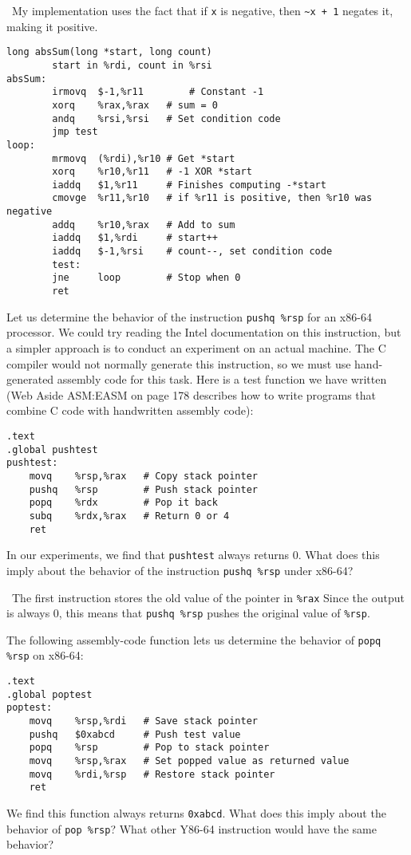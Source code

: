 \documentclass[12pt]{article}
\newenvironment{ex}[2][Exercise]{\begin{trivlist}
		\item[\hskip \labelsep {\bfseries #1}\hskip \labelsep {\bfseries #2.}]}{\end{trivlist}}
\newenvironment{sol}[1][Solution]{\begin{trivlist}
		\item[\hskip \labelsep {\bfseries #1:}]}{\end{trivlist}}
\begin{document}
\begin{sol}
	\
	My implementation uses the fact that if \texttt{x} is negative, then
	\texttt{\~{}x + 1} negates it, making it positive.
\begin{lstlisting}[language={}]
		long absSum(long *start, long count)
		start in %rdi, count in %rsi
absSum:
		irmovq	$-1,%r11		# Constant -1
		xorq	%rax,%rax	# sum = 0
		andq	%rsi,%rsi	# Set condition code
		jmp test
loop:
		mrmovq	(%rdi),%r10	# Get *start
		xorq	%r10,%r11	# -1 XOR *start
		iaddq	$1,%r11		# Finishes computing -*start
		cmovge	%r11,%r10	# if %r11 is positive, then %r10 was negative
		addq	%r10,%rax	# Add to sum
		iaddq	$1,%rdi		# start++
		iaddq	$-1,%rsi	# count--, set condition code
		test:
		jne		loop		# Stop when 0
		ret
	\end{lstlisting}
\end{sol}

\begin{ex}{4.7}
	Let us determine the behavior of the instruction \texttt{pushq \%rsp}
	for an x86-64 processor. We could try reading the Intel documentation
	on this instruction, but a simpler approach is to conduct an experiment
	on an actual machine. The C compiler would not normally generate this
	instruction, so we must use hand-generated assembly code for this task.
	Here is a test function we have written (Web Aside ASM:EASM on page
	178 describes how to write programs that combine C code with handwritten
	assembly code):
	\begin{lstlisting}[language={}]
	.text
.global pushtest
pushtest:
	movq	%rsp,%rax	# Copy stack pointer
	pushq	%rsp		# Push stack pointer
	popq	%rdx		# Pop it back
	subq	%rdx,%rax	# Return 0 or 4
	ret
	\end{lstlisting}
	In our experiments, we find that \texttt{pushtest} always returns 0.
	What does this imply about the behavior of the instruction
	\texttt{pushq \%rsp} under x86-64?
\end{ex}

\begin{sol}
	\
	The first instruction stores the old value of the pointer in \texttt{\%rax}
	Since the output is always 0, this means that \texttt{pushq \%rsp}
	pushes the original value of \texttt{\%rsp}.
\end{sol}

\begin{ex}{4.8}
	The following assembly-code function lets us determine the behavior of
	\texttt{popq \%rsp} on x86-64:
	\begin{lstlisting}[language={}]
	.text
.global poptest
poptest:
	movq	%rsp,%rdi	# Save stack pointer
	pushq	$0xabcd		# Push test value
	popq	%rsp		# Pop to stack pointer
	movq	%rsp,%rax	# Set popped value as returned value
	movq	%rdi,%rsp	# Restore stack pointer
	ret
	\end{lstlisting}
	We find this function always returns \texttt{0xabcd}. What does this imply
	about the behavior of \texttt{pop \%rsp}? What other Y86-64 instruction would
	have the same behavior?
\end{ex}
\end{document}
